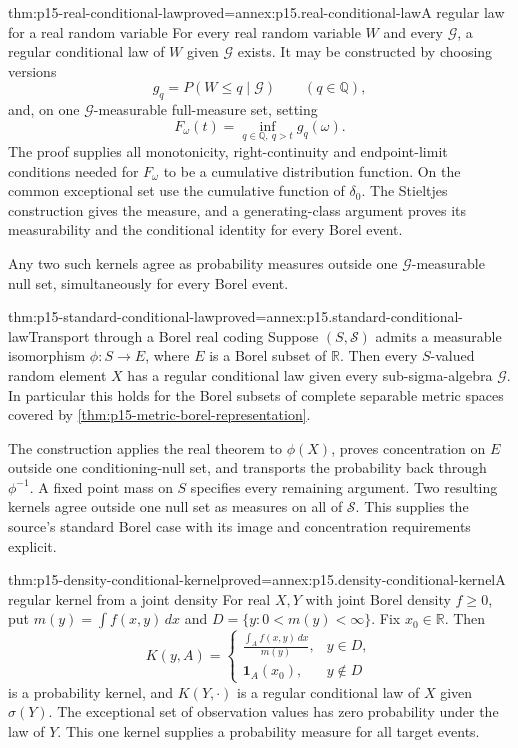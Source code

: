 \begin{hbtheorem}{thm:p15-real-conditional-law}{proved=annex:p15.real-conditional-law}{A regular law for a real random variable}
For every real random variable \(W\) and every \(\mathcal G\),
a regular conditional law of \(W\) given \(\mathcal G\) exists.
It may be constructed by choosing versions
\[
                          g_q=P(W\leq q\mid\mathcal G)
                                     \qquad(q\in\mathbb Q),
\]
and, on one \(\mathcal G\)-measurable full-measure set, setting
\[
                          F_\omega(t)=\inf_{q\in\mathbb Q,\ q>t}g_q(\omega).
\]
The proof supplies all monotonicity, right-continuity and endpoint-limit
conditions needed for \(F_\omega\) to be a cumulative distribution function.
On the common exceptional set use the cumulative function of \(\delta_0\).
The Stieltjes construction gives the measure, and a generating-class
argument proves its measurability and the conditional identity for every
Borel event.

Any two such kernels agree as probability measures outside one
\(\mathcal G\)-measurable null set, simultaneously for every Borel event.
\end{hbtheorem}

\begin{hbtheorem}{thm:p15-standard-conditional-law}{proved=annex:p15.standard-conditional-law}{Transport through a Borel real coding}
Suppose \((S,\mathcal S)\) admits a measurable isomorphism
\(\phi:S\to E\), where \(E\) is a Borel subset of \(\mathbb R\).
Then every \(S\)-valued random element \(X\) has a regular conditional
law given every sub-sigma-algebra \(\mathcal G\).
In particular this holds for the Borel subsets of complete separable
metric spaces covered by \cref{thm:p15-metric-borel-representation}.

The construction applies the real theorem to \(\phi(X)\), proves
concentration on \(E\) outside one conditioning-null set, and transports
the probability back through \(\phi^{-1}\). A fixed point mass on \(S\)
specifies every remaining argument. Two resulting kernels agree outside
one null set as measures on all of \(\mathcal S\).
This supplies the source's standard Borel case with its image and
concentration requirements explicit.
\end{hbtheorem}

\begin{hbtheorem}{thm:p15-density-conditional-kernel}{proved=annex:p15.density-conditional-kernel}{A regular kernel from a joint density}
For real \(X,Y\) with joint Borel density \(f\geq0\), put
\(m(y)=\int f(x,y)\,dx\) and \(D=\{y:0<m(y)<\infty\}\).
Fix \(x_0\in\mathbb R\). Then
\[
 K(y,A)=
 \begin{cases}
  \displaystyle\frac{\int_Af(x,y)\,dx}{m(y)},&y\in D,\\
  \mathbf1_A(x_0),&y\notin D
 \end{cases}
\]
is a probability kernel, and \(K(Y,\cdot)\) is a regular conditional
law of \(X\) given \(\sigma(Y)\).
The exceptional set of observation values has zero probability under
the law of \(Y\). This one kernel supplies a probability measure for
all target events.
\end{hbtheorem}

